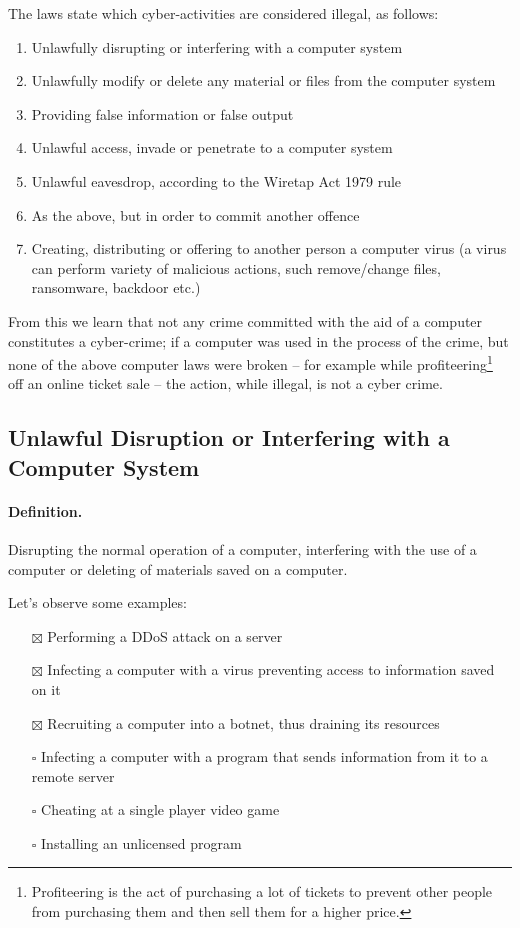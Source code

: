The laws state which cyber-activities are considered illegal, as follows:
\begin{enumerate}
    \item Unlawfully disrupting or interfering with a computer system
    \item Unlawfully modify or delete any material or files from the computer system
    \item Providing false information or false output
    \item Unlawful access, invade or penetrate to a computer system
    \item Unlawful eavesdrop, according to the Wiretap Act 1979 rule
    \item As the above, but in order to commit another offence
    \item Creating, distributing or offering to another person a computer virus (a virus can perform  variety of malicious actions, such remove/change files, ransomware, backdoor etc.)
\end{enumerate}

From this we learn that not any crime committed with the aid of a computer
constitutes a cyber-crime; if a computer was used in the process of the crime,
but none of the above computer laws were broken -- for example while
profiteering\footnote{Profiteering is the act of purchasing a lot of tickets to
prevent other people from purchasing them and then sell them for a higher
price.} off an online ticket sale -- the action, while illegal, is not a cyber
crime.


\subsection{Unlawful Disruption or Interfering with a Computer System}

\paragraph{Definition.} Disrupting the normal operation of a computer,
interfering with the use of a computer or deleting of materials saved on a
computer.

Let's observe some examples:
\begin{itemize}
    \item[$\boxtimes$] Performing a DDoS attack on a server
    \item[$\boxtimes$] Infecting a computer with a virus preventing access to
    information saved on it
    \item[$\boxtimes$] Recruiting a computer into a botnet, thus draining its
    resources
    \item[$\square$] Infecting a computer with a program that sends information
    from it to a remote server
    \item[$\square$] Cheating at a single player video game
    \item[$\square$] Installing an unlicensed program
\end{itemize}

